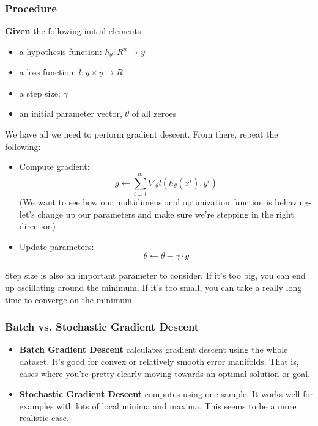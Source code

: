 \documentclass[english, 10pt]{article}
\begin{document}
\subsubsection{Procedure}

\textbf{Given} the following initial elements:

\begin{myproof}

\begin{itemize}
	\item a hypothesis function: $h_{\theta}:R^n \rightarrow y$
	\item a loss function: $l:y \times y \rightarrow R_+$
	\item a step size: $\gamma$
	\item an initial parameter vector, $\theta$ of all zeroes
\end{itemize}
\end{myproof}

We have all we need to perform gradient descent. From there, repeat the following:

\begin{myproof}
\begin{itemize}
	\item Compute gradient: $$ g \leftarrow \sum_{i=1}^{m}{\nabla_{\theta} l(h_{\theta}(x^i), y^i)}$$
	(We want to see how our multidimensional optimization function is behaving- let's change up our parameters and make sure we're stepping in the right direction)
	\item Update parameters: $$ \theta \leftarrow \theta - \gamma \cdot g$$
\end{itemize}
\end{myproof}

Step size is also an important parameter to consider. If it's too big, you can end up oscillating around the minimum. If it's too small, you can take a really long time to converge on the minimum.

\subsubsection{Batch vs. Stochastic Gradient Descent}

\begin{itemize}
	\item \textbf{Batch Gradient Descent} calculates gradient descent using the whole dataset. It's good for convex or relatively smooth error manifolds. That is, cases where you're pretty clearly moving towards an optimal solution or goal.
	\item \textbf{Stochastic Gradient Descent} computes using one sample. It works well for examples with lots of local minima and maxima. This seems to be a more realistic case.
\end{itemize}
\end{document}
